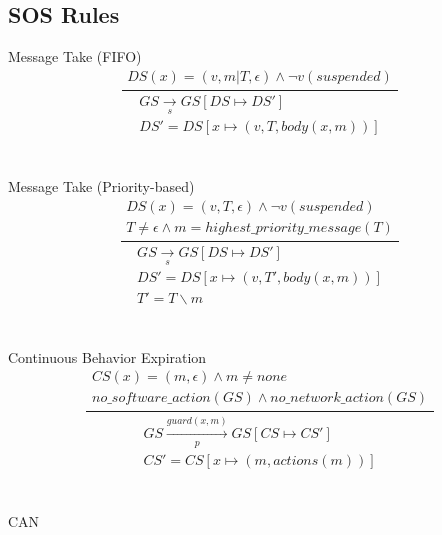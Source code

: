\documentclass[]{article}
\begin{document}
\subsection{SOS Rules} 
Message Take (FIFO) \\
\begin{equation}
\frac
{
	\begin{gathered}
		DS(x)=(v,m|T,\epsilon) \wedge \neg v(suspended) 
	\end{gathered}
}
{
	\begin{gathered}
	GS\xrightarrow[s]{}GS[DS\longmapsto DS']  \\
	DS' = DS[x\longmapsto (v,T,body(x,m))]
	\end{gathered}
}
\end{equation}
\\\\
Message Take (Priority-based)
\begin{equation}
\frac
{
	\begin{gathered}
	DS(x)=(v,T,\epsilon) \wedge \neg v(suspended) \\
	T \neq \epsilon \wedge m = highest\_priority\_message(T)
	\end{gathered}
}
{
	\begin{gathered}
	GS\xrightarrow[s]{}GS[DS\longmapsto DS']  \\
	DS' = DS[x\longmapsto (v,T',body(x,m))] \\
	T' = T \backslash m
	\end{gathered}
}
\end{equation}
\\\\
Continuous Behavior Expiration
\begin{equation}\label{ContinuousBehaviorExpiration}
\frac
{
	\begin{gathered}
	CS(x)=(m, \epsilon) \wedge m \neq none \\ 
	no\_software\_action(GS) \wedge no\_network\_action(GS)
	\end{gathered}
}
{
	\begin{gathered}
	GS \xrightarrow[p]{guard(x,m)} GS[CS\longmapsto CS']\\
	CS' = CS[x\longmapsto (m,actions(m))]
	\end{gathered}
}
\end{equation}
\\\\
CAN
\end{document}
